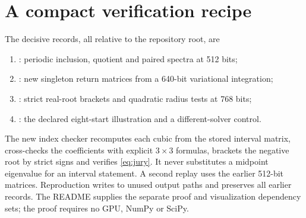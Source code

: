 \documentclass[11pt]{article}
\begin{document}
\section{A compact verification recipe}
The decisive records, all relative to the repository root, are
\begin{enumerate}
\raggedright
\item {}: periodic
inclusion, quotient and paired spectra at 512 bits;
\item {}:
new singleton return matrices from a 640-bit variational integration;
\item {}:
strict real-root brackets and quadratic radius tests at 768 bits;
\item {}: the declared
eight-start illustration and a different-solver control.
\end{enumerate}
The new index checker recomputes each cubic from the stored interval
matrix, cross-checks the coefficients with explicit $3\times3$ formulas,
brackets the negative root by strict signs and verifies
\eqref{eq:jury}. It never substitutes a midpoint eigenvalue for an
interval statement. A second replay uses the earlier 512-bit matrices.
Reproduction writes to unused output paths and preserves all earlier
records. The README supplies the separate proof and visualization
dependency sets; the proof requires no GPU, NumPy or SciPy.
\end{document}
